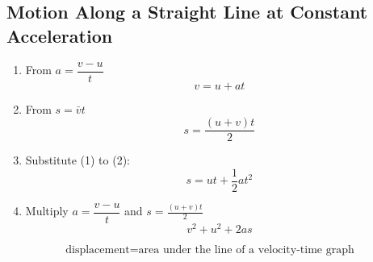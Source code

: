 \subsection{Motion Along a Straight Line at Constant Acceleration}

\begin{enumerate}
    \item From $a=\dfrac{v-u}{t}$
        $$v=u+at$$
    \item From $s=\bar{v}t$
        $$s=\frac{(u+v)t}{2}$$
    \item Substitute (1) to (2):
        $$s=ut+\frac{1}{2}at^2$$
    \item Multiply $a=\dfrac{v-u}{t}$ and $s=\frac{(u+v)t}{2}$
        $$v^2+u^2+2as$$
\end{enumerate}

$$\text{displacement}=\text{area under the line of a velocity-time graph}$$
